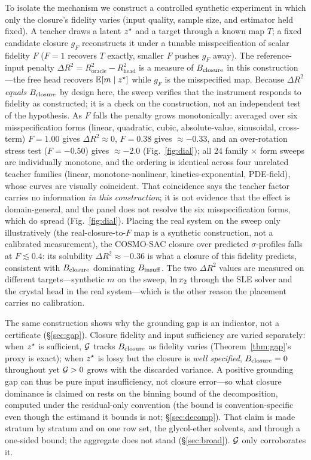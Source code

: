 To isolate the mechanism we construct a controlled synthetic experiment in which only the closure's
fidelity varies (input quality, sample size, and estimator held fixed). A teacher draws a latent
$z^\star$ and a target through a known map $T$; a fixed candidate closure $g_F$ reconstructs it under
a tunable misspecification of scalar fidelity $F$ ($F=1$ recovers $T$ exactly, smaller $F$ pushes
$g_F$ away). The reference-input penalty $\Delta R^2 = R^2_{\text{oracle}}-R^2_{\text{head}}$ is a measure
of $B_{\mathrm{closure}}$ in this construction---the free head recovers $\mathbb{E}[m\mid z^\star]$ while $g_F$ is the misspecified map. Because
$\Delta R^2$ \emph{equals} $B_{\mathrm{closure}}$ by design here, the sweep verifies that the instrument responds to
fidelity as constructed; it is a check on the construction, not an independent test of the
hypothesis. As $F$
falls the penalty grows monotonically: averaged over six misspecification forms
(linear, quadratic, cubic, absolute-value, sinusoidal, cross-term) $F{=}1.00$ gives
$\Delta R^2\approx0$, $F{=}0.38$ gives $\approx-0.33$, and an over-rotation stress test ($F{=}{-}0.50$)
gives $\approx-2.0$ (Fig.~\ref{fig:dial}); all $24$ family$\,\times\,$form sweeps are individually
monotone, and the ordering is identical across four unrelated teacher
families (linear, monotone-nonlinear, kinetics-exponential, PDE-field), whose curves are visually
coincident. That coincidence says the teacher factor carries no information \emph{in this
construction}; it is not evidence that the effect is domain-general, and the panel does not resolve
the six misspecification forms, which do spread (Fig.~\ref{fig:dial}). Placing the real system on the sweep only illustratively
(the real-closure-to-$F$ map is a synthetic construction, not a calibrated measurement), the COSMO-SAC
closure over predicted $\sigma$-profiles falls at $F\lesssim0.4$: its solubility $\Delta R^2\approx-0.36$
is what a closure of this fidelity predicts, consistent with $B_{\mathrm{closure}}$ dominating $B_{\mathrm{insuff}}$. The two
$\Delta R^2$ values are measured on different targets---synthetic $m$ on the sweep, $\ln x_2$ through the
SLE solver and the crystal head in the real system---which is the other reason the placement carries
no calibration.

The same construction shows why the grounding gap is an indicator, not a certificate (\S\ref{sec:gap}).
Closure fidelity and input sufficiency are varied separately: when $z^\star$ is sufficient, $\mathcal{G}$
tracks $B_{\mathrm{closure}}$ as fidelity varies
(Theorem~\ref{thm:gap}'s proxy is exact); when $z^\star$ is lossy but the closure is \emph{well specified},
$B_{\mathrm{closure}}=0$ throughout yet $\mathcal{G}>0$ grows with the discarded variance. A
positive grounding gap can thus be pure input insufficiency, not closure error---so what
closure dominance is claimed on rests on the binning bound of the decomposition,
computed under the residual-only convention (the bound is convention-specific even though the estimand it
bounds is not; \S\ref{sec:decomp}). That claim is made stratum by stratum and on one row set, the
glycol-ether solvents, and through a one-sided bound; the aggregate does not
stand (\S\ref{sec:broad}). $\mathcal{G}$ only corroborates it.

